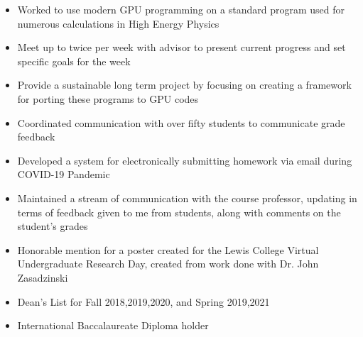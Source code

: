 \documentclass[10pt,a4paper,ragged2e]{altacv}
\begin{document}
\divider

\begin{itemize}
\item Worked to use modern GPU programming on a standard program used for numerous calculations in High Energy Physics
\item Meet up to twice per week with advisor to present current progress and set specific goals for the week
\item Provide a sustainable long term project by focusing on creating a framework for porting these programs to GPU codes 
\end{itemize}

\divider

\begin{itemize}
\item Coordinated communication with over fifty students to communicate grade feedback
\item Developed a system for electronically submitting homework via email during COVID-19 Pandemic
\item Maintained a stream of communication with the course professor, updating in terms of feedback given to me from students, along with comments on the student's grades
\end{itemize}

\divider

\begin{itemize}
\item Honorable mention for a poster created for the Lewis College Virtual Undergraduate Research Day, created from work done with Dr. John Zasadzinski
\item Dean's List for Fall 2018,2019,2020, and Spring 2019,2021
\item International Baccalaureate Diploma holder
\end{itemize}

\clearpage
\nocite{*}
\end{document}
